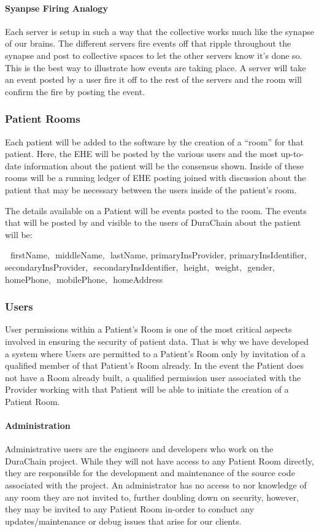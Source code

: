 \documentclass[12pt]{article}
\begin{document}
      \paragraph{Syanpse Firing Analogy}
      Each server is setup in such a way that the collective works much like the synapse of our brains. The different servers fire events off that ripple throughout the synapse and post to collective spaces to let the other servers know it’s done so. This is the best way to illustrate how events are taking place. A server will take an event posted by a user fire it off to the rest of the servers and the room will confirm the fire by posting the event.

    \subsubsection{Patient Rooms}
    Each patient will be added to the software by the creation of a “room” for that patient. Here, the EHE will be posted by the various users and the most up-to-date information about the patient will be the consensus shown. Inside of these rooms will be a running ledger of EHE posting joined with discussion about the patient that may be necessary between the users inside of the patient’s room.

    The details available on a Patient will be events posted to the room. The events that will be posted by and visible to the users of DuraChain about the patient will be:

    { 
    firstName, 
    middleName, 
    lastName,
    primaryInsProvider,
    primaryInsIdentifier, 
    secondaryInsProvider, 
    secondaryInsIdentifier, 
    height, 
    weight, 
    gender, 
    homePhone, 
    mobilePhone, 
    homeAddress
    }

    \subsubsection{Users}
    User permissions within a Patient’s Room is one of the most critical aspects involved in ensuring the security of patient data. That is why we have developed a system where Users are permitted to a Patient’s Room only by invitation of a qualified member of that Patient’s Room already. In the event the Patient does not have a Room already built, a qualified permission user associated with the Provider working with that Patient will be able to initiate the creation of a Patient Room.

    \paragraph{Administration}
    Administrative users are the engineers and developers who work on the DuraChain project. While they will not have access to any Patient Room directly, they are responsible for the development and maintenance of the source code associated with the project. An administrator has no access to nor knowledge of any room they are not invited to, further doubling down on security, however, they may be invited to any Patient Room in-order to conduct any updates/maintenance or debug issues that arise for our clients.
\end{document}
